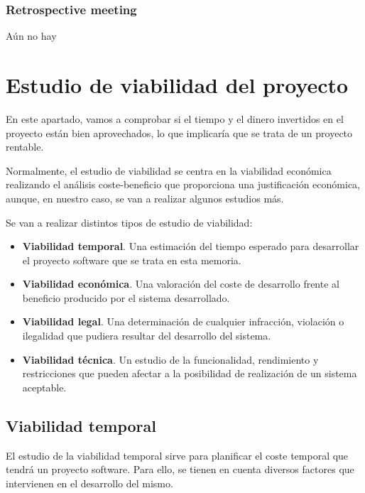 

\subsubsection*{Retrospective meeting}
Aún no hay

\newpage

\newcommand{\pesoscasosdeuso}{\operatorname{Peso De Casos De Uso}}
\newcommand{\pesosactores}{\operatorname{Peso De Actores}}

\section{Estudio de viabilidad del proyecto}
En este apartado, vamos a comprobar si el tiempo y el dinero invertidos en el proyecto están bien aprovechados, lo que implicaría que se trata de un proyecto rentable.

Normalmente, el estudio de viabilidad se centra en la viabilidad económica realizando el análisis coste-beneficio que proporciona una justificación económica, aunque, en nuestro caso, se van a realizar algunos estudios más.

Se van a realizar distintos tipos de estudio de viabilidad:

\begin{itemize}
\item \textbf{Viabilidad temporal}. Una estimación del tiempo esperado para desarrollar el proyecto software que se trata en esta memoria.
\item \textbf{Viabilidad económica}. Una valoración del coste de desarrollo frente al beneficio producido por el sistema desarrollado.
\item \textbf{Viabilidad legal}. Una determinación de cualquier infracción, violación o ilegalidad que pudiera resultar del desarrollo del sistema.
\item \textbf{Viabilidad técnica}. Un estudio de la funcionalidad, rendimiento y restricciones que pueden afectar a la posibilidad de realización de un sistema aceptable.
\end{itemize}
 
\subsection{Viabilidad temporal}
El estudio de la viabilidad temporal sirve para planificar el coste temporal que tendrá un proyecto software. Para ello, se tienen en cuenta diversos factores que intervienen en el desarrollo del mismo.

